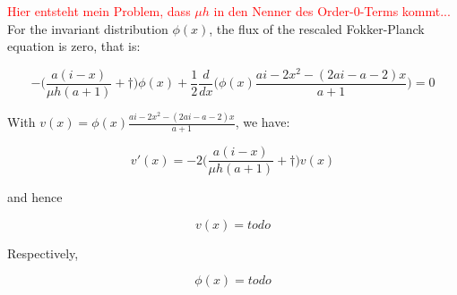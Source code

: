 \textcolor{red}{Hier entsteht mein Problem, dass $\mu h$ in den Nenner des Order-0-Terms kommt...}\newline
For the invariant distribution $\phi(x)$, the flux of the rescaled Fokker-Planck equation is zero, that is:

\begin{equation*}
	-\Big(\frac{a(i-x)}{\mu h(a+1)} + \dagger\Big)\phi(x) + \frac{1}{2} \frac{d}{dx}\Big(\phi(x)\frac{ai - 2x^2 - (2ai - a -2)x}{a+1}\Big)= 0
\end{equation*}

With $v(x) = \phi(x)\frac{ai - 2x^2 - (2ai - a -2)x}{a+1}$, we have:

\begin{equation*}
	v'(x) = -2\Big(\frac{a(i-x)}{\mu h(a+1)} + \dagger\Big)v(x)
\end{equation*}

and hence

\begin{equation*}
	v(x) = todo
\end{equation*}

Respectively,

\begin{equation*}
	\phi(x) = todo
\end{equation*}
